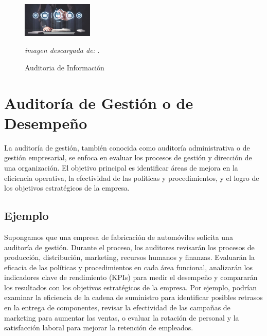 \documentclass[12pt,a4paper]{article}
\begin{document}
\begin{figure}[!htb]
    \centering
    \caption{Auditoria de Información} 

    \includegraphics[width=0.3\textwidth]{images/fig_sistemas.jpg}
    \par
    \textit{imagen descargada de:} \cite{fig_software}.

\end{figure}

\newpage
\section{Auditoría de Gestión o de Desempeño} 
La auditoría de gestión, también conocida como auditoría administrativa o de gestión empresarial, se enfoca en evaluar los procesos de gestión y dirección de una organización. El objetivo principal es identificar áreas de mejora en la eficiencia operativa, la efectividad de las políticas y procedimientos, y el logro de los objetivos estratégicos de la empresa.
\cite{audit_gestion}
\subsection*{Ejemplo}
Supongamos que una empresa de fabricación de automóviles solicita una auditoría de gestión. Durante el proceso, los auditores revisarán los procesos de producción, distribución, marketing, recursos humanos y finanzas. Evaluarán la eficacia de las políticas y procedimientos en cada área funcional, analizarán los indicadores clave de rendimiento (KPIs) para medir el desempeño y compararán los resultados con los objetivos estratégicos de la empresa. Por ejemplo, podrían examinar la eficiencia de la cadena de suministro para identificar posibles retrasos en la entrega de componentes, revisar la efectividad de las campañas de marketing para aumentar las ventas, o evaluar la rotación de personal y la satisfacción laboral para mejorar la retención de empleados.
\end{document}
